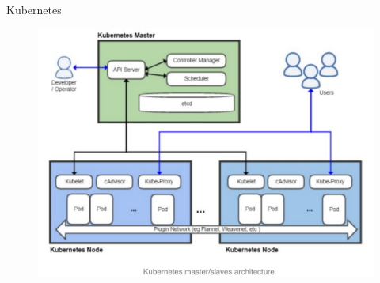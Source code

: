 \begin{frame}{Kubernetes}

  \begin{figure}
    \centering
    \includegraphics[page=1,scale=0.33]{res/images/CaptionK8s}
  \end{figure}

\end{frame}